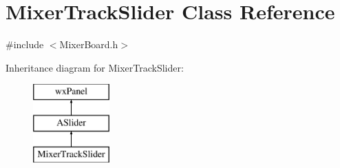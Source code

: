 \hypertarget{class_mixer_track_slider}{}\section{Mixer\+Track\+Slider Class Reference}
\label{class_mixer_track_slider}


{\ttfamily \#include $<$Mixer\+Board.\+h$>$}

Inheritance diagram for Mixer\+Track\+Slider\+:\begin{figure}[H]
\begin{center}
\leavevmode
\includegraphics[height=3.000000cm]{class_mixer_track_slider}
\end{center}
\end{figure}
